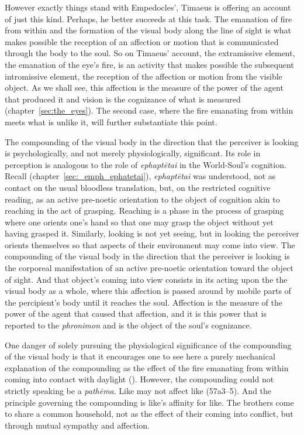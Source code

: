 However exactly things stand with Empedocles', Timaeus is offering an account of just this kind. Perhaps, he better succeeds at this task. The emanation of fire from within and the formation of the visual body along the line of sight is what makes possible the reception of an affection or motion that is communicated through the body to the soul. So on Timaeus' account, the extramissive element, the emanation of the eye's fire, is an activity that makes possible the subsequent intromissive element, the reception of the affection or motion from the visible object. As we shall see, this affection is the measure of the power of the agent that produced it and vision is the cognizance of what is measured (chapter~\ref{sec:the_eyes}). The second case, where the fire emanating from within meets what is unlike it, will further substantiate this point.

The compounding of the visual body in the direction that the perceiver is looking is psychologically, and not merely physiologically, significant. Its role in perception is analogous to the role of \emph{ephaptētai} in the World-Soul's cognition. Recall (chapter~\ref{sec:_emph_ephatetai}), \emph{ephaptētai} was understood, not as contact on the usual bloodless translation, but, on the restricted cognitive reading, as an active pre-noetic orientation to the object of cognition akin to reaching in the act of grasping. Reaching is a phase in the process of grasping where one orients one's hand so that one may grasp the object without yet having grasped it. Similarly, looking is not yet seeing, but in looking the perceiver orients themselves so that aspects of their environment may come into view. The compounding of the visual body in the direction that the perceiver is looking is the corporeal manifestation of an active pre-noetic orientation toward the object of sight. And that object's coming into view consists in its acting upon the the visual body as a whole, where this affection is passed around by mobile parts of the percipient's body until it reaches the soul. Affection is the measure of the power of the agent that caused that affection, and it is this power that is reported to the \emph{phronimon} and is the object of the soul's cognizance.

One danger of solely pursuing the physiological significance of the compounding of the visual body is that it encourages one to see here a purely mechanical explanation of the compounding as the effect of the fire emanating from within coming into contact with daylight (\citealt[130-1]{Betegh:2019fq}). However, the compounding could not strictly speaking be a \emph{pathēma}. Like may not affect like (57a3–5). And the principle governing the compounding is like's affinity for like. The brothers come to share a common household, not as the effect of their coming into conflict, but through mutual sympathy and affection.

